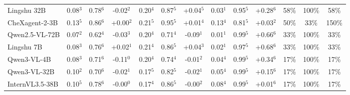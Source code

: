 \documentclass{article}
\begin{document}
\begin{table}[t]
{\begin{tabular}{l@{\hspace{3pt}}ccc@{\hspace{4pt}}ccc@{\hspace{4pt}}ccc@{\hspace{4pt}}ccc}
\midrule
Lingshu 32B & \cellcolor{cfSage2}0.08$^{3}$ & \cellcolor{cfSage3}0.78$^{6}$ & \cellcolor{cfSlate2}-0.02$^{2}$ & \cellcolor{cfSage4}0.20$^{4}$ & \cellcolor{cfSage3}0.87$^{5}$ & \cellcolor{cfTerra2}+0.04$^{5}$ & \cellcolor{cfSage1}0.03$^{1}$ & \cellcolor{cfSage4}0.95$^{5}$ & \cellcolor{cfTerra4}+0.28$^{6}$ & \cellcolor{cfTerra4}58\% & \cellcolor{cfTerra4}100\% & 58\% \\
CheXagent-2-3B & \cellcolor{cfSage3}0.13$^{5}$ & \cellcolor{cfSage3}0.86$^{6}$ & \cellcolor{cfTerra1}+0.00$^{2}$ & \cellcolor{cfSage4}0.21$^{5}$ & \cellcolor{cfSage4}0.95$^{5}$ & \cellcolor{cfTerra1}+0.01$^{4}$ & \cellcolor{cfSage3}0.13$^{4}$ & \cellcolor{cfSage3}0.81$^{5}$ & \cellcolor{cfTerra2}+0.03$^{2}$ & \cellcolor{cfTerra4}50\% & \cellcolor{cfTerra2}33\% & 150\% \\
Qwen2.5-VL-72B & \cellcolor{cfSage2}0.07$^{2}$ & \cellcolor{cfSage2}0.62$^{4}$ & \cellcolor{cfSlate2}-0.03$^{3}$ & \cellcolor{cfSage3}0.20$^{4}$ & \cellcolor{cfSage2}0.71$^{4}$ & \cellcolor{cfSlate2}-0.09$^{1}$ & \cellcolor{cfSage1}0.01$^{1}$ & \cellcolor{cfSage4}0.99$^{5}$ & \cellcolor{cfTerra4}+0.66$^{6}$ & \cellcolor{cfTerra3}33\% & \cellcolor{cfTerra4}100\% & 33\% \\
Lingshu 7B & \cellcolor{cfSage2}0.08$^{3}$ & \cellcolor{cfSage3}0.76$^{6}$ & \cellcolor{cfTerra2}+0.02$^{1}$ & \cellcolor{cfSage4}0.21$^{4}$ & \cellcolor{cfSage3}0.86$^{5}$ & \cellcolor{cfTerra2}+0.04$^{3}$ & \cellcolor{cfSage1}0.02$^{1}$ & \cellcolor{cfSage4}0.97$^{5}$ & \cellcolor{cfTerra4}+0.68$^{6}$ & \cellcolor{cfTerra3}33\% & \cellcolor{cfTerra4}100\% & 33\% \\
Qwen3-VL-4B & \cellcolor{cfSage2}0.08$^{3}$ & \cellcolor{cfSage2}0.71$^{6}$ & \cellcolor{cfSlate3}-0.11$^{0}$ & \cellcolor{cfSage4}0.20$^{4}$ & \cellcolor{cfSage2}0.74$^{4}$ & \cellcolor{cfSlate1}-0.01$^{2}$ & \cellcolor{cfSage1}0.04$^{4}$ & \cellcolor{cfSage4}0.99$^{5}$ & \cellcolor{cfTerra4}+0.34$^{6}$ & \cellcolor{cfTerra3}17\% & \cellcolor{cfTerra4}100\% & 17\% \\
Qwen3-VL-32B & \cellcolor{cfSage2}0.10$^{2}$ & \cellcolor{cfSage2}0.70$^{6}$ & \cellcolor{cfSlate2}-0.02$^{1}$ & \cellcolor{cfSage3}0.17$^{5}$ & \cellcolor{cfSage3}0.82$^{5}$ & \cellcolor{cfSlate2}-0.02$^{1}$ & \cellcolor{cfSage2}0.05$^{4}$ & \cellcolor{cfSage4}0.99$^{5}$ & \cellcolor{cfTerra3}+0.15$^{6}$ & \cellcolor{cfTerra3}17\% & \cellcolor{cfTerra4}100\% & 17\% \\
InternVL3.5-38B & \cellcolor{cfSage2}0.10$^{5}$ & \cellcolor{cfSage3}0.78$^{6}$ & \cellcolor{cfSlate1}-0.00$^{0}$ & \cellcolor{cfSage3}0.17$^{4}$ & \cellcolor{cfSage3}0.86$^{5}$ & \cellcolor{cfSlate1}-0.00$^{2}$ & \cellcolor{cfSage2}0.08$^{4}$ & \cellcolor{cfSage4}0.99$^{5}$ & \cellcolor{cfTerra1}+0.01$^{6}$ & \cellcolor{cfTerra3}17\% & \cellcolor{cfTerra4}100\% & 17\% \\

\end{tabular}}
\end{table}
\end{document}
